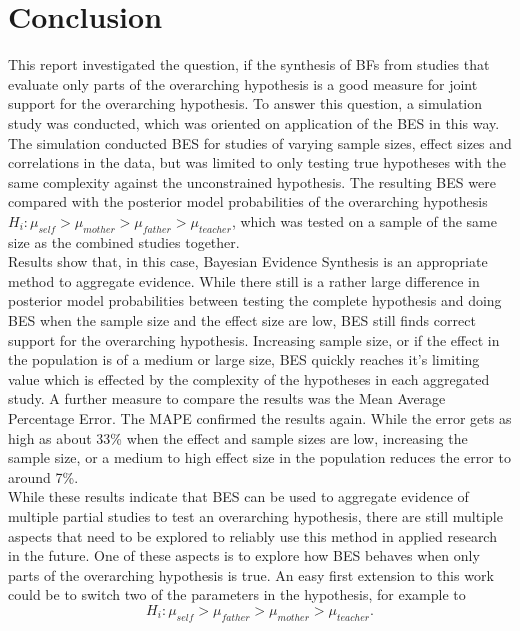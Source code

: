 \documentclass[12pt]{article}
\begin{document}
\section{Conclusion}
This report investigated the question, if the synthesis of BFs from studies that evaluate only parts of the overarching hypothesis is a good measure for joint support for the overarching hypothesis. To answer this question, a simulation study was conducted, which was oriented on \citet{kevenaar_bayesian_2021} application of the BES in this way. The simulation conducted BES for studies of varying sample sizes, effect sizes and correlations in the data, but was limited to only testing true hypotheses with the same complexity against the unconstrained hypothesis. The resulting BES were compared with the posterior model probabilities of the overarching hypothesis $H_i: \mu_{self} > \mu_{mother} > \mu_{father} > \mu_{teacher}$, which was tested on a sample of the same size as the combined studies together.\\
Results show that, in this case, Bayesian Evidence Synthesis is an appropriate method to aggregate evidence. While there still is a rather large difference in posterior model probabilities between testing the complete hypothesis and doing BES when the sample size and the effect size are low, BES still finds correct support for the overarching hypothesis. Increasing sample size, or if the effect in the population is of a medium or large size, BES quickly reaches it's limiting value which is effected by the complexity of the hypotheses in each aggregated study. A further measure to compare the results was the Mean Average Percentage Error. The MAPE confirmed the results again. While the error gets as high as about 33\% when the effect and sample sizes are low, increasing the sample size, or a medium to high effect size in the population reduces the error to around 7\%. \\
While these results indicate that BES can be used to aggregate evidence of multiple partial studies to test an overarching hypothesis, there are still multiple aspects that need to be explored to reliably use this method in applied research in the future. One of these aspects is to explore how BES behaves when only parts of the overarching hypothesis is true. An easy first extension to this work could be to switch two of the parameters in the hypothesis, for example to
\begin{equation*}
    H_i: \mu_{self} > \mu_{father} > \mu_{mother} > \mu_{teacher}.
\end{equation*}
\end{document}
